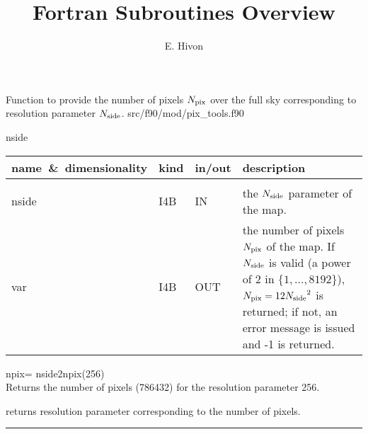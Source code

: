 
\sloppy


\title{\healpix Fortran Subroutines Overview}
 \section[nside2npix]{ }
\label{sub:nside2npix}
\author{E. Hivon}

\begin{facility}
{Function to provide the number of pixels ${N_{\rm pix}}$ over the full sky corresponding
to resolution parameter ${N_{\rm side}}$. 
}
{src/f90/mod/pix\_tools.f90}
\end{facility}

\begin{f90function}
{nside}
\end{f90function}

\begin{arguments}
{
\begin{tabular}{p{0.3\hsize} p{0.05\hsize} p{0.1\hsize} p{0.45\hsize}} \hline  
\textbf{name~\&~dimensionality} & \textbf{kind} & \textbf{in/out} & \textbf{description} \\ \hline
                   &   &   &                           \\ %
nside & I4B & IN & the ${N_{\rm side}}$ parameter of the map. \\
var & I4B & OUT & the number of pixels ${N_{\rm pix}}$ of the map. If ${N_{\rm side}}$ is valid (a power of 2 in
$\{1,\ldots,8192\}$), ${N_{\rm pix}}=12{N_{\rm side}}^2$ is returned; if not, an error message is
issued and -1 is returned.\\
\end{tabular}
}
\end{arguments}

\begin{example}
{
npix= nside2npix(256)  \\
}
{
Returns the number of \healpix pixels (786432) for the resolution
parameter 256.
}
\end{example}
\begin{related}
  \begin{sulist}{} %
  \item[\htmlref{npix2nside}{sub:npix2nside}] returns resolution parameter corresponding to the number of pixels.
  \end{sulist}
\end{related}

\rule{\hsize}{2mm}

